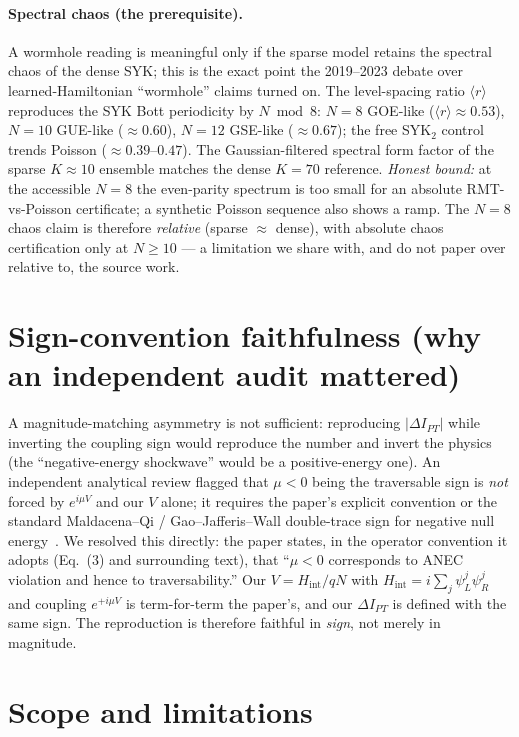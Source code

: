 \documentclass[11pt]{article}
\newcommand{\dIPT}{\Delta I_{PT}}
\begin{document}
\paragraph{Spectral chaos (the prerequisite).} A wormhole reading is meaningful
only if the sparse model retains the spectral chaos of the dense SYK; this is the
exact point the 2019--2023 debate over learned-Hamiltonian ``wormhole'' claims
turned on. The level-spacing ratio $\langle r\rangle$ reproduces the SYK Bott
periodicity by $N \bmod 8$: $N=8$ GOE-like ($\langle r\rangle\approx0.53$), $N=10$
GUE-like ($\approx0.60$), $N=12$ GSE-like ($\approx0.67$); the free SYK$_2$
control trends Poisson ($\approx0.39$--$0.47$). The Gaussian-filtered spectral
form factor of the sparse $K\approx10$ ensemble matches the dense $K=70$
reference. \emph{Honest bound:} at the accessible $N=8$ the even-parity spectrum
is too small for an absolute RMT-vs-Poisson certificate; a synthetic Poisson
sequence also shows a ramp. The $N=8$ chaos claim is therefore \emph{relative}
(sparse $\approx$ dense), with absolute chaos certification only at $N\ge10$ ---
a limitation we share with, and do not paper over relative to, the source work.

\section{Sign-convention faithfulness (why an independent audit mattered)}

A magnitude-matching asymmetry is not sufficient: reproducing $|\dIPT|$ while
inverting the coupling sign would reproduce the number and invert the physics
(the ``negative-energy shockwave'' would be a positive-energy one). An
independent analytical review flagged that $\mu<0$ being the traversable sign is
\emph{not} forced by $e^{i\mu V}$ and our $V$ alone; it requires the paper's
explicit convention or the standard Maldacena--Qi / Gao--Jafferis--Wall
double-trace sign for negative null energy~\cite{maldacenaqi,gjw}. We resolved
this directly: the paper states, in the operator convention it adopts (Eq.~(3)
and surrounding text), that ``$\mu<0$ corresponds to ANEC violation and hence to
traversability.'' Our $V=H_{\text{int}}/qN$ with $H_{\text{int}}=i\sum_j
\psi_L^j\psi_R^j$ and coupling $e^{+i\mu V}$ is term-for-term the paper's, and our
$\dIPT$ is defined with the same sign. The reproduction is therefore faithful in
\emph{sign}, not merely in magnitude.

\section{Scope and limitations}
\end{document}
